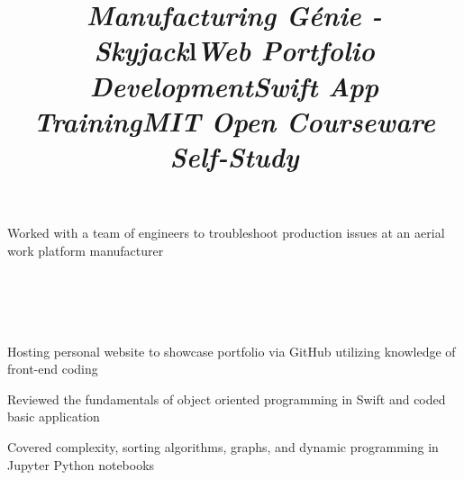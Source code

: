 \documentclass[mm]{res}
\begin{document}
\begin{resume}
\title{\textsl{Manufacturing G\'enie - Skyjack}}
\begin{position}
\tb Worked with a team of engineers to troubleshoot production issues at an aerial work platform manufacturer
\end{position}


\toprule

\section{\headingprojects}
\begin{format}
\title{l}\\
\body\\
\end{format}


\title{\textsl{Web Portfolio Development}}
\begin{position}
\tb Hosting personal website to showcase portfolio via GitHub utilizing knowledge of front-end coding
\end{position}

\title{\textsl{Swift App Training}}
\begin{position}
\tb Reviewed the fundamentals of object oriented programming in Swift and coded basic application
\end{position}


\title{\textsl{MIT Open Courseware Self-Study}}
\begin{position}
\tb Covered complexity, sorting algorithms, graphs, and dynamic programming in Jupyter Python notebooks
\end{position}


\end{resume}
\end{document}
